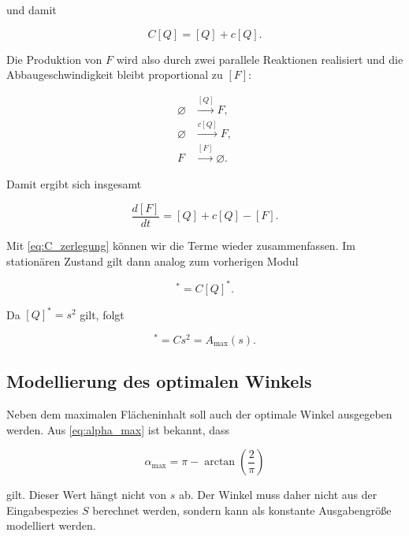 und damit 

\begin{equation}
    C[Q]
    =
    [Q]+c[Q].
\end{equation}

Die Produktion von \(F\) wird also durch zwei parallele Reaktionen
realisiert und die Abbaugeschwindigkeit bleibt proportional zu \([F]\):

\begin{equation}
\begin{aligned}    
    \varnothing &\xrightarrow{[Q]} F,\\
    \varnothing &\xrightarrow{c[Q]} F,\\
    F &\xrightarrow{[F]} \varnothing.
\end{aligned}
\end{equation}


Damit ergibt sich insgesamt

\begin{equation}
    \frac{d[F]}{dt}
    =
    [Q]+c[Q]-[F].
    \label{eq:F_dynamik}
\end{equation}

Mit \eqref{eq:C_zerlegung} können wir die Terme wieder zusammenfassen. Im stationären Zustand gilt dann analog zum vorherigen Modul

\begin{equation}
    [F]^*=C[Q]^*.
\end{equation}

Da \([Q]^*=s^2\) gilt, folgt

\begin{equation}
    [F]^*=Cs^2=A_{\max}(s).
\end{equation}


\subsection{Modellierung des optimalen Winkels}

Neben dem maximalen Flächeninhalt soll auch der optimale Winkel ausgegeben
werden. Aus \eqref{eq:alpha_max} ist bekannt, dass

\begin{equation}
    \alpha_{\max}
    =
    \pi-\arctan\left(\frac{2}{\pi}\right)
\end{equation}

gilt. Dieser Wert hängt nicht von \(s\) ab. Der Winkel muss daher nicht aus
der Eingabespezies \(S\) berechnet werden, sondern kann als konstante
Ausgabengröße modelliert werden.


